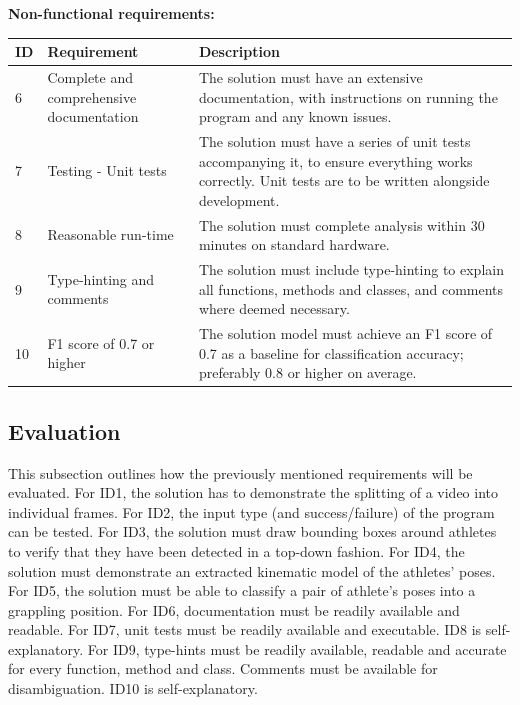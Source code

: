 \documentclass[a4paper, oneside, 11pt]{article}
\begin{document}
\textbf{Non-functional requirements:}
\begin{center}
    \begin{tabular}{|p{4mm}|p{50mm}|p{100mm}|}
    \hline
    \textbf{ID} & \textbf{Requirement} & \textbf{Description} \\
    \hline
    \hline
    6 & Complete and comprehensive documentation & The solution must have an extensive documentation, with instructions on running the program and any known issues. \\
    \hline
    7 & Testing - Unit tests & The solution must have a series of unit tests accompanying it, to ensure everything works correctly. Unit tests are to be written alongside development. \\
    \hline
    8 & Reasonable run-time & The solution must complete analysis within 30 minutes on standard hardware. \\
    \hline
    9 & Type-hinting and comments & The solution must include type-hinting to explain all functions, methods and classes, and comments where deemed necessary. \\
    \hline
    10 & F1 score of 0.7 or higher & The solution model must achieve an F1 score of 0.7 as a baseline for classification accuracy; preferably 0.8 or higher on average. \\
    \hline
    \end{tabular}
\end{center}

\subsection{Evaluation}

This subsection outlines how the previously mentioned requirements will be evaluated.
For ID1, the solution has to demonstrate the splitting of a video into individual frames. For ID2, the input type (and success/failure) of the program can be tested. For ID3, the solution must draw bounding boxes around athletes to verify that they have been detected in a top-down fashion. For ID4, the solution must demonstrate an extracted kinematic model of the athletes' poses. For ID5, the solution must be able to classify a pair of athlete's poses into a grappling position. For ID6, documentation must be readily available and readable. For ID7, unit tests must be readily available and executable. ID8 is self-explanatory. For ID9, type-hints must be readily available, readable and accurate for every function, method and class. Comments must be available for disambiguation. ID10 is self-explanatory.
\end{document}
